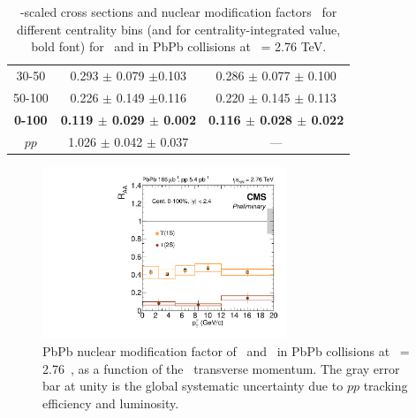 \begin{table}[hbtp]
\begin{centering}
\begin{tabular}{|c|c|c|}
      30-50  & 0.293 $\pm$ 0.079 $\pm$0.103  & 0.286 $\pm$ 0.077 $\pm$ 0.100   \\  
      50-100 & 0.226 $\pm$ 0.149 $\pm$0.116  & 0.220 $\pm$ 0.145 $\pm$ 0.113   \\  
      \textbf{0-100}  & \textbf{0.119 $\pm$ 0.029 $\pm$ 0.002} & \textbf{0.116 $\pm$ 0.028  $\pm$ 0.022}  \\  
      \hline 
       $pp$     & 1.026 $\pm$ 0.042 $\pm$  0.037  & --- \\
      \hline 
    \end{tabular}
    \caption{\TAA-scaled cross sections and nuclear modification
      factors \RAA\ for different centrality bins (and for
      centrality-integrated value, bold font) for \PgUa\ and \PgUb in
      PbPb collisions at \snn\ = 2.76 TeV.}
    \label{tab:centraa}
  \end{centering}
\end{table}

\begin{figure}[h]
  \begin{centering}  
    \includegraphics[width=0.65\textwidth]{Chapters/aUpsilon/RAA_Pt-1.pdf}
    \caption{PbPb nuclear modification factor of \PgUa\ and \PgUb\ in PbPb collisions
      at \snn\ = 2.76~\TeV, as a function of the \PgU\ transverse momentum. The gray error bar at unity is the global
      systematic uncertainty due to $pp$ tracking efficiency and luminosity.}
    \label{fig:raapt}
  \end{centering}  
\end{figure}

